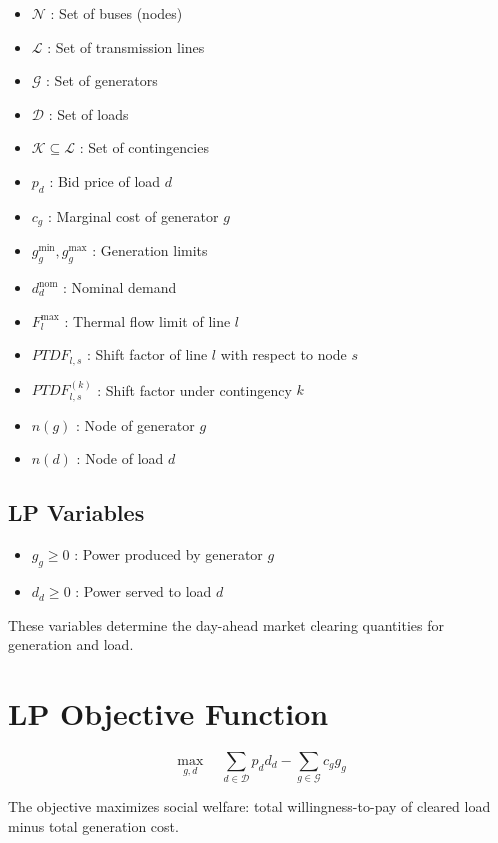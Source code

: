 \documentclass[11pt]{article}
\begin{document}
\begin{itemize}
    \item $\mathcal{N}$ : Set of buses (nodes)
    \item $\mathcal{L}$ : Set of transmission lines
    \item $\mathcal{G}$ : Set of generators
    \item $\mathcal{D}$ : Set of loads
    \item $\mathcal{K} \subseteq \mathcal{L}$ : Set of contingencies
    \item $p_d$ : Bid price of load $d$
    \item $c_g$ : Marginal cost of generator $g$
    \item $g_g^{\min}, g_g^{\max}$ : Generation limits
    \item $d_d^{\text{nom}}$ : Nominal demand
    \item $F_l^{\max}$ : Thermal flow limit of line $l$
    \item $PTDF_{l,s}$ : Shift factor of line $l$ with respect to node $s$
    \item $PTDF_{l,s}^{(k)}$ : Shift factor under contingency $k$
    \item $n(g)$ : Node of generator $g$
    \item $n(d)$ : Node of load $d$
\end{itemize}

\subsection{LP Variables}

\begin{itemize}
    \item $g_g \ge 0$ : Power produced by generator $g$
    \item $d_d \ge 0$ : Power served to load $d$
\end{itemize}

 
These variables determine the day-ahead market clearing quantities for generation and load.

\section*{LP Objective Function}

\begin{equation}
\max_{g,d} \quad
\sum_{d \in \mathcal{D}} p_d d_d
-
\sum_{g \in \mathcal{G}} c_g g_g
\end{equation}

 
The objective maximizes social welfare: total willingness-to-pay of cleared load minus total generation cost.
\end{document}
